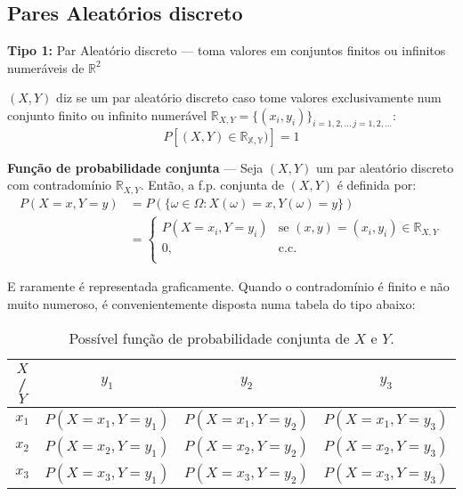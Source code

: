 \clearpage
\subsection[3.1 Pares Aleatórios discreto]{\hspace*{0.075 em}\raisebox{0.2 em}{$\pmb{\drsh}$} Pares Aleatórios discreto}

\noindent\textbf{Tipo 1:} Par Aleatório discreto --- toma valores em conjuntos finitos ou infinitos numeráveis de $\mathbb{R}^2$

\begin{mdframed}
$(X,Y)$ diz se um par aleatório discreto caso tome valores exclusivamente num conjunto finito ou infinito numerável $\mathbb{R}_{X,Y} = \{(x_i,y_i)\}_{i=1,2,\dots\,j=1,2,\dots}$:
$$
    P[(X,Y) \in \mathbb{R_{X,Y}})] = 1
$$
\end{mdframed}

\noindent\textbf{Função de probabilidade conjunta} --- Seja $(X,Y)$ um par aleatório discreto com contradomínio $\mathbb{R}_{X,Y}$. Então, a f.p. conjunta de $(X,Y)$ é definida por:
$$
\begin{aligned}
    P(X = x, Y = y) &= P(\{\omega \in \Omega: X(\omega) = x, Y(\omega) = y\})\\
    &=\left\{
            \begin{array}{ll}
                  P(X = x_i, Y = y_i) & \text{se } (x,y) = (x_i,y_i) \in \mathbb{R}_{X,Y}\\
                   0, & \text{c.c.}\\
            \end{array} 
      \right.
\end{aligned}
$$

\noindent E raramente é representada graficamente. Quando o contradomínio é finito e não muito numeroso, é convenientemente disposta numa tabela do tipo abaixo:

\begin{table}[h]
    \centering
    {\renewcommand{\arraystretch}{1.25}%
    \begin{tabular}{|c|ccc|}
        \hline
        $X$ / $Y$ & $y_1$ & $y_2$ & $y_3$ \\
        \hline
        $x_1$ & $P(X=x_1, Y=y_1)$ & $P(X=x_1, Y=y_2)$ & $P(X=x_1, Y=y_3)$ \\
        $x_2$ & $P(X=x_2, Y=y_1)$ & $P(X=x_2, Y=y_2)$ & $P(X=x_2, Y=y_3)$ \\
        $x_3$ & $P(X=x_3, Y=y_1)$ & $P(X=x_3, Y=y_2)$ & $P(X=x_3, Y=y_3)$ \\
        \hline
    \end{tabular}
    }
    \caption{Possível função de probabilidade conjunta de $X$ e $Y$.}
\end{table}

